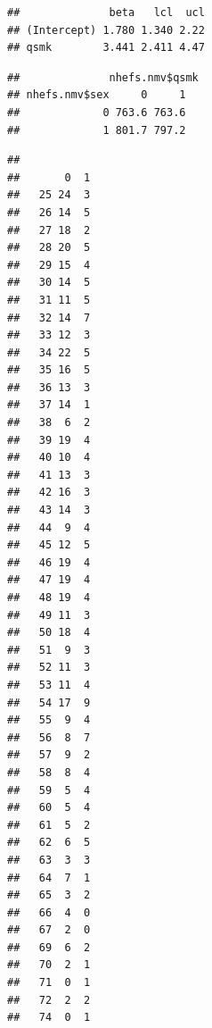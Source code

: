 \documentclass[
  10pt,
]{book}
\newenvironment{Shaded}{\begin{snugshade}}{\end{snugshade}}
\newcommand{\CommentTok}[1]{\textcolor[rgb]{0.56,0.35,0.01}{\textit{#1}}}
\newcommand{\DecValTok}[1]{\textcolor[rgb]{0.00,0.00,0.81}{#1}}
\newcommand{\KeywordTok}[1]{\textcolor[rgb]{0.13,0.29,0.53}{\textbf{#1}}}
\newcommand{\NormalTok}[1]{#1}
\newcommand{\OperatorTok}[1]{\textcolor[rgb]{0.81,0.36,0.00}{\textbf{#1}}}
\newcommand{\StringTok}[1]{\textcolor[rgb]{0.31,0.60,0.02}{#1}}
\begin{document}
\begin{verbatim}
##              beta   lcl  ucl
## (Intercept) 1.780 1.340 2.22
## qsmk        3.441 2.411 4.47
\end{verbatim}

\begin{Shaded}
\end{Shaded}

\begin{verbatim}
##              nhefs.nmv$qsmk
## nhefs.nmv$sex     0     1
##             0 763.6 763.6
##             1 801.7 797.2
\end{verbatim}

\begin{Shaded}
\end{Shaded}

\begin{verbatim}
##     
##       0  1
##   25 24  3
##   26 14  5
##   27 18  2
##   28 20  5
##   29 15  4
##   30 14  5
##   31 11  5
##   32 14  7
##   33 12  3
##   34 22  5
##   35 16  5
##   36 13  3
##   37 14  1
##   38  6  2
##   39 19  4
##   40 10  4
##   41 13  3
##   42 16  3
##   43 14  3
##   44  9  4
##   45 12  5
##   46 19  4
##   47 19  4
##   48 19  4
##   49 11  3
##   50 18  4
##   51  9  3
##   52 11  3
##   53 11  4
##   54 17  9
##   55  9  4
##   56  8  7
##   57  9  2
##   58  8  4
##   59  5  4
##   60  5  4
##   61  5  2
##   62  6  5
##   63  3  3
##   64  7  1
##   65  3  2
##   66  4  0
##   67  2  0
##   69  6  2
##   70  2  1
##   71  0  1
##   72  2  2
##   74  0  1
\end{verbatim}
\end{document}
